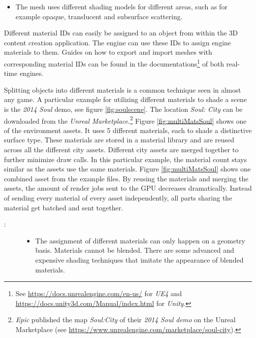 \begin{description}
\begin{itemize}
		\item The mesh uses different shading models for different areas, such as for example opaque, translucent and subsurface scattering.
	\end{itemize}
	\item[\patImplementation:]%
	Different material IDs can easily be assigned to an object from within the 3D content creation application. The engine can use these IDs to assign engine materials to them. Guides on how to export and import meshes with corresponding material IDs can be found in the documentations\footnote{See \url{https://docs.unrealengine.com/en-us/} for \emph{UE4} and \url{https://docs.unity3d.com/Manual/index.html} for \emph{Unity}.} of both real-time engines.
	\item[\patExamples:]%
	Splitting objects into different materials is a common technique seen in almost any game. A particular example for utilizing different materials to shade a scene is the \emph{2014 Soul} \cite{soultechdemo2014} demo, see figure \ref{fig:soulscene}. The location \emph{Soul: City} can be downloaded from the \emph{Unreal Marketplace}.\footnote{\emph{Epic} published the map \emph{Soul:City} \cite{epic2018soul} of their \emph{2014 Soul demo} on the Unreal Marketplace (see \url{https://www.unrealengine.com/marketplace/soul-city}).} Figure \ref{fig:multiMatsSoul} shows one of the environment assets. It uses 5 different materials, each to shade a distinctive surface type. These materials are stored in a material library and are reused across all the different city assets. Different city assets are merged together to further minimize draw calls. In this particular example, the material count stays similar as the assets use the same materials. Figure \ref{fig:multiMatsSoul} shows one combined asset from the example files. By reusing the materials and merging the assets, the amount of render jobs sent to the GPU decreases dramatically. Instead of sending every material of every asset independently, all parts sharing the material get batched and sent together.  
	\item[\patConsequences:]\hfill 
		\begin{description}
			\item[\visual:]\hfill
			\begin{itemize}\mynobreakpar
				\item The assignment of different materials can only happen on a geometry basis. Materials cannot be blended. There are some advanced and expensive shading techniques that imitate the appearance of blended materials.

\end{itemize}
\end{description}
\end{description}
